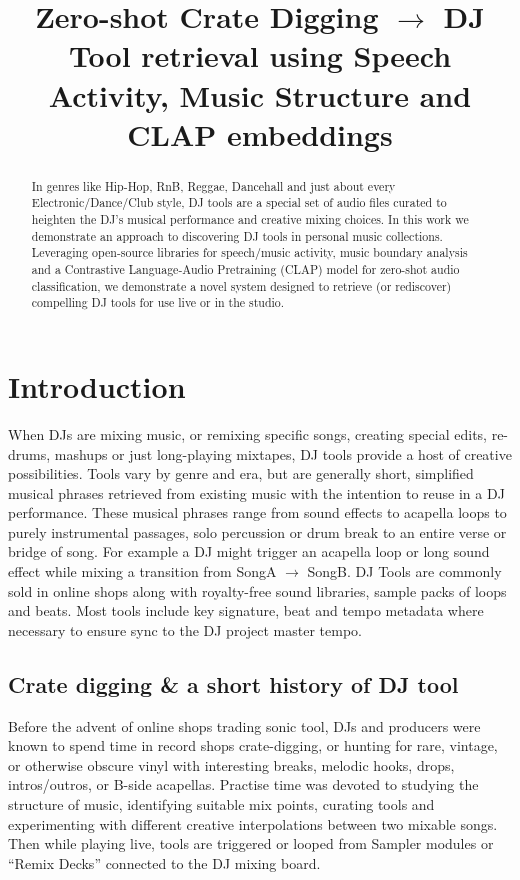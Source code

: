 \documentclass{article}
\title{Zero-shot Crate Digging $\rightarrow$ DJ Tool retrieval using Speech Activity, Music Structure and CLAP embeddings}
\begin{document}
%
\maketitle
%
\begin{abstract}
In genres like Hip-Hop, RnB, Reggae, Dancehall and just about every Electronic/Dance/Club style, DJ tools are a special set of audio files curated to heighten the DJ's musical performance and creative mixing choices. In this work we demonstrate an approach to discovering DJ tools in personal music collections. Leveraging open-source libraries for speech/music activity, music boundary analysis and a Contrastive Language-Audio Pretraining (CLAP) model for zero-shot audio classification, we demonstrate a novel system designed to retrieve (or rediscover) compelling DJ tools for use live or in the studio.
 \end{abstract}

%
\section{Introduction}\label{sec:introduction}
When DJs are mixing music, or remixing specific songs, creating special edits, re-drums, mashups or just long-playing mixtapes, DJ tools provide a host of creative possibilities. Tools vary by genre and era, but are generally short, simplified musical phrases retrieved from existing music with the intention to reuse in a DJ performance. These musical phrases range from sound effects to acapella loops to purely instrumental passages, solo percussion or drum break to an entire verse or bridge of song. For example a DJ might trigger an acapella loop or long sound effect while mixing a transition from SongA $\rightarrow$ SongB. DJ Tools are commonly sold in online shops along with royalty-free sound libraries, sample packs of loops and beats. Most tools include key signature, beat and tempo metadata where necessary to ensure sync to the DJ project master tempo.

\subsection{Crate digging \& a short history of DJ tool}\label{sec:history}

Before the advent of online shops trading sonic tool, DJs and producers were known to spend time in record shops crate-digging, or hunting for rare, vintage, or otherwise obscure vinyl with interesting breaks, melodic hooks, drops, intros/outros, or B-side acapellas. Practise time was devoted to studying the structure of music, identifying suitable mix points, curating tools and experimenting with different creative interpolations between two mixable songs. Then while playing live, tools are triggered or looped from Sampler modules or ``Remix Decks'' connected to the DJ mixing board.
\end{document}
